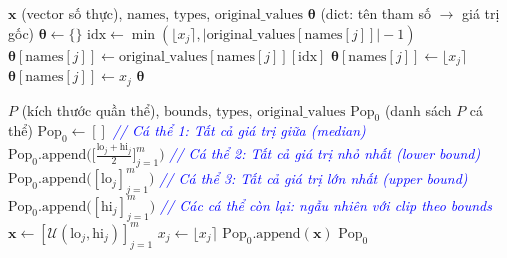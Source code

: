 \documentclass[12pt,a4paper]{article}
\begin{document}
\begin{algorithm}[H]
\caption{Giải mã cá thể về tham số gốc (\textsc{DecodeIndividual})}
\label{alg:ga_decode}
\begin{algorithmic}[1]
\Require $\mathbf{x}$ (vector số thực), $\text{names}$, $\text{types}$, $\text{original\_values}$
\Ensure $\boldsymbol{\theta}$ (dict: tên tham số $\rightarrow$ giá trị gốc)
\State $\boldsymbol{\theta} \gets \{\}$
        \State $\text{idx} \gets \min(\lfloor x_j \rceil, |\text{original\_values}[\text{names}[j]]| - 1)$ 
        \State $\boldsymbol{\theta}[\text{names}[j]] \gets \text{original\_values}[\text{names}[j]][\text{idx}]$
        \State $\boldsymbol{\theta}[\text{names}[j]] \gets \lfloor x_j \rceil$ 
    \Else
        \State $\boldsymbol{\theta}[\text{names}[j]] \gets x_j$ 
    \EndIf
\EndFor
\State \Return $\boldsymbol{\theta}$
\end{algorithmic}
\end{algorithm}

\begin{algorithm}[H]
\caption{Khởi tạo thông minh quần thể (\textsc{SmartInitialization})}
\label{alg:ga_init}
\begin{algorithmic}[1]
\Require $P$ (kích thước quần thể), $\text{bounds}$, $\text{types}$, $\text{original\_values}$
\Ensure $\text{Pop}_0$ (danh sách $P$ cá thể)
\State $\text{Pop}_0 \gets []$
\Statex \textcolor{blue}{\textit{// Cá thể 1: Tất cả giá trị giữa (median)}}
\State $\text{Pop}_0.\text{append}\Big(\Big[\frac{\text{lo}_j + \text{hi}_j}{2}\Big]_{j=1}^{m}\Big)$
\Statex \textcolor{blue}{\textit{// Cá thể 2: Tất cả giá trị nhỏ nhất (lower bound)}}
\State $\text{Pop}_0.\text{append}\Big([\text{lo}_j]_{j=1}^{m}\Big)$
\Statex \textcolor{blue}{\textit{// Cá thể 3: Tất cả giá trị lớn nhất (upper bound)}}
\State $\text{Pop}_0.\text{append}\Big([\text{hi}_j]_{j=1}^{m}\Big)$
\Statex \textcolor{blue}{\textit{// Các cá thể còn lại: ngẫu nhiên với clip theo bounds}}
    \State $\mathbf{x} \gets [\mathcal{U}(\text{lo}_j, \text{hi}_j)]_{j=1}^{m}$
            \State $x_j \gets \lfloor x_j \rceil$ 
        \EndIf
    \EndFor
    \State $\text{Pop}_0.\text{append}(\mathbf{x})$
\EndWhile
\State \Return $\text{Pop}_0$
\end{algorithmic}
\end{algorithm}
\end{document}
